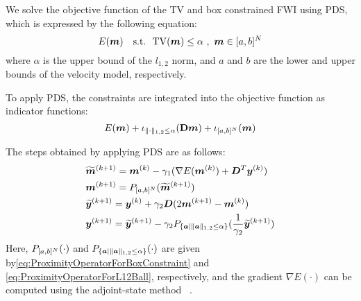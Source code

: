 We solve the objective function of the TV and box constrained FWI using PDS, which is expressed by the following equation:
\begin{equation} \label{eq:FWIObjectiveWithTVConstraint} \FWIObjectiveWithTVConstraint \end{equation}
where $\alpha$ is the upper bound of the $l_{1,2}$ norm, and $a$ and $b$ are the lower and upper bounds of the velocity model, respectively.

To apply PDS, the constraints are integrated into the objective function as indicator functions:
\begin{equation} \label{eq:FWIObjectiveWithTVConstraintWithIndicatorFunction} \FWIObjectiveWithTVConstraintWithIndicatorFunction \end{equation}

The steps obtained by applying PDS are as follows:
\begin{equation} \label{eq:FWIWithPDS} \FWIWithPDS \notag \end{equation}
Here, $\projBox{\cdot}$ and $\projLOneTwoBall{\cdot}$ are given by\eqref{eq:ProximityOperatorForBoxConstraint} and \eqref{eq:ProximityOperatorForL12Ball}, respectively, and the gradient ${\nabla E(\cdot)}$ can be computed using the adjoint-state method ~\cite{FWI-gradient}.

